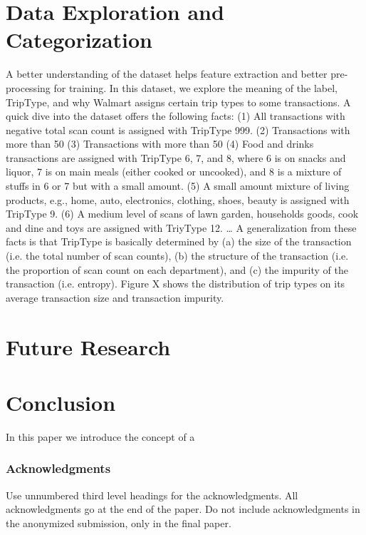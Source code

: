 \documentclass{article} %
\begin{document}
\section{Data Exploration and Categorization}
A better understanding of the dataset helps feature extraction and better pre-processing for training. In this dataset, we explore the meaning of the label, TripType, and why Walmart assigns certain trip types to some transactions. A quick dive into the dataset offers the following facts:
(1) All transactions with negative total scan count is assigned with TripType 999.
(2) Transactions with more than 50%
(3) Transactions with more than 50%
(4) Food and drinks transactions are assigned with TripType 6, 7, and 8, where 6 is on snacks and liquor, 7 is on main meals (either cooked or uncooked), and 8 is a mixture of stuffs in 6 or 7 but with a small amount.
(5) A small amount mixture of living products, e.g., home, auto, electronics, clothing, shoes, beauty is assigned with TripType 9.
(6) A medium level of scans of lawn garden, households goods, cook and dine and toys are assigned with TriyType 12.
…
A generalization from these facts is that TripType is basically determined by (a) the size of the transaction (i.e. the total number of scan counts), (b) the structure of the transaction (i.e. the proportion of scan count on each department), and (c) the impurity of the transaction (i.e. entropy). 
Figure X shows the distribution of trip types on its average transaction size and transaction impurity.

\section{Future Research}


\section{Conclusion}
In this paper we introduce the concept of a 


\subsubsection*{Acknowledgments}

Use unnumbered third level headings for the acknowledgments. All
acknowledgments go at the end of the paper. Do not include 
acknowledgments in the anonymized submission, only in the 
final paper. 
\end{document}
